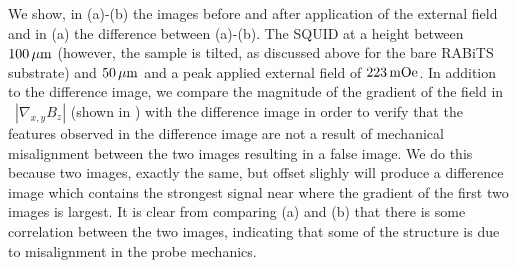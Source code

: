 We show, in (a)-(b) the images before
and after application of the external field and in 
(a) the difference between 
(a)-(b).
The SQUID at a height
between $100\,\mu\mathrm{m}$ (however, the sample is tilted, as discussed 
above for the bare RABiTS substrate) and  
$50\,\mu\mathrm{m}$ and a peak applied external field of $223\,\mathrm{mOe}$. 
In addition to the difference image, we compare the 
magnitude of the gradient of the field in 
\ $\left| \nabla_{x,y} B_z \right|$
(shown in ) with the difference 
image in order to verify that the features observed in the 
difference image are not a result of mechanical misalignment
between the two images resulting in a false image.
We do this because two images, exactly the same, but offset slighly
will produce a difference image which contains the strongest
signal near where the gradient of the first two images is largest.
 It is clear 
from comparing  (a) and (b) that 
there is some correlation between the two images, indicating that some
of the structure is due to misalignment in the probe mechanics. 

